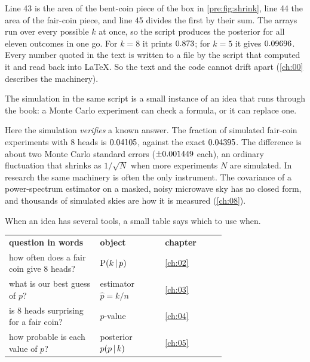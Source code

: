 Line 43 is the area of the bent-coin piece of the box in \cref{pre:fig:shrink},
line 44 the area of the fair-coin piece, and line 45 divides the first by their
sum.
The arrays run over every possible $k$ at once, so the script produces the
posterior for all eleven outcomes in one go. For $k=8$ it prints
$0.873$; for $k=5$ it gives $0.09696$. Every number quoted
in the text is written to a file by the script that computed it and read back
into \LaTeX. So the text and the code cannot drift apart (\cref{ch:00}
describes the machinery).

The simulation in the same script is a small instance of an idea that runs
through the book: a Monte Carlo experiment can check a formula, or it can
replace one.

\begin{inpractice}
Here the simulation \emph{verifies} a known answer. The fraction of
simulated fair-coin experiments with 8 heads is $0.04105$, against the
exact $0.04395$. The difference is about two Monte Carlo standard errors
($\pm0.001449$ each), an ordinary fluctuation that shrinks as $1/\sqrt{N}$
when more experiments $N$ are simulated. In research the same machinery is
often the only instrument. The covariance of a power-spectrum estimator on a
masked, noisy microwave sky has no closed form, and thousands of simulated
skies are how it is measured (\cref{ch:08}).

\smallskip{}
\end{inpractice}

When an idea has several tools, a small table says which to use when.

\begin{taxonomy}
\small
\begin{tabular}{@{}p{0.42\linewidth}p{0.3\linewidth}l@{}}
  \textbf{question in words} & \textbf{object} & \textbf{chapter}\\
  how often does a fair coin give 8 heads? & $\operatorname{P}(k\,\vert\, p)$ & \cref{ch:02}\\
  what is our best guess of $p$? & estimator $\hat p=k/n$ & \cref{ch:03}\\
  is 8 heads surprising for a fair coin? & $p$-value & \cref{ch:04}\\
  how probable is each value of $p$? & posterior $p(p\,\vert\, k)$ & \cref{ch:05}\\
\end{tabular}

\smallskip{}
\end{taxonomy}

